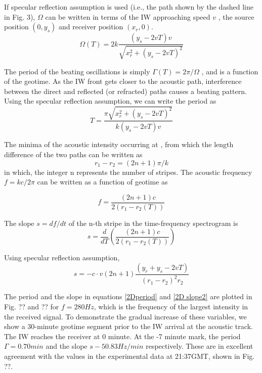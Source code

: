 If specular reflection assumption is used (i.e., the path shown by the dashed line in Fig. 3), $\Omega$ can be written in terms of the IW approaching speed $v$ , the source position $(0,y_s)$  and receiver position $(x_r ,0)$.
\begin{equation}\label{2Dfreq2}
\Omega(T)=2k\frac{(y_s-2vT)v}{\sqrt{x_r^2+(y_s-2vT)^2}}
\end{equation}

The period of the beating oscillations is simply $\Gamma(T)=2\pi/\Omega$ , and is a function of the geotime. As the IW front gets closer to the acoustic path, interference between the direct and reflected (or refracted) paths causes a beating pattern. Using the specular reflection assumption, we can write the period as 
\begin{equation}\label{2Dperiod}
T=\frac{\pi\sqrt{x_r^2+(y_s-2vT)^2}}{k(y_s-2vT)v}
\end{equation} 

The minima of the acoustic intensity  occurring at , from which the length difference of the two paths can be written as 
\begin{equation}\label{2D3}
r_1-r_2=(2n+1)\pi/k
\end{equation}
in which, the integer n represents the number of stripes. The acoustic frequency $f=kc/2\pi$  can be written as a function of geotime as 

\begin{equation}\label{2D4}
f=\frac{(2n+1)c}{2(r_1-r_2(T))}
\end{equation}

The slope $s=df/dt$  of the n-th stripe in the time-frequency spectrogram is
\begin{equation}\label{2D slope}
s=\frac{d}{dT}\left(\frac{(2n+1)c}{2(r_1-r_2(T))}\right)
\end{equation}

Using specular reflection assumption, 
\begin{equation}\label{2D slope2}
s=-c\cdot v(2n+1)\frac{(y_r+y_s-2vT)}{(r_1-r_2)^2r_2}
\end{equation}

The period and the slope in equations \ref{2Dperiod} and \ref{2D slope2} are plotted in Fig. ?? and ?? for $f=280Hz$, which is the frequency of the largest intensity in the received signal. To demonstrate the gradual increase of these variables, we show a 30-minute geotime segment prior to the IW arrival at the acoustic track. The IW reaches the receiver at 0 minute. At the -7 minute mark, the period $\Gamma=0.70min$  and the slope $s-50.83Hz/min$  respectively. These are in excellent agreement with the values in the experimental data at 21:37GMT, shown in Fig. ??. 

